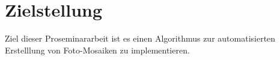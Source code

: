﻿\section{Zielstellung}
Ziel dieser Proseminararbeit ist es einen Algorithmus zur automatisierten Erstelllung von Foto-Mosaiken zu implementieren. 